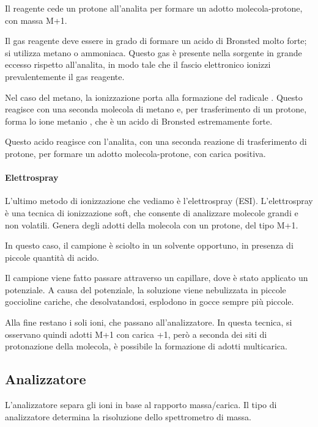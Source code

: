 Il reagente cede un protone all'analita per formare un adotto
molecola-protone, con massa M+1.

Il gas reagente deve essere in grado di formare un acido di Bronsted
molto forte; si utilizza metano o ammoniaca. Questo gas è presente nella
sorgente in grande eccesso rispetto all'analita, in modo tale che il
fascio elettronico ionizzi prevalentemente il gas reagente.

Nel caso del metano, la ionizzazione porta alla formazione del radicale
. Questo reagisce con una seconda molecola di metano e, per
trasferimento di un protone, forma lo ione metanio , che è un
acido di Bronsted estremamente forte.

Questo acido reagisce con l'analita, con una seconda reazione di
trasferimento di protone, per formare un adotto molecola-protone, con
carica positiva.

\paragraph{Elettrospray}

L'ultimo metodo di ionizzazione che vediamo è l'elettrospray (ESI).
L'elettrospray è una tecnica di ionizzazione soft, che consente di
analizzare molecole grandi e non volatili. Genera degli adotti della
molecola con un protone, del tipo M+1.


In questo caso, il campione è sciolto in un solvente opportuno, in
presenza di piccole quantità di acido.

Il campione viene fatto passare attraverso un capillare, dove è stato
applicato un potenziale. A causa del potenziale, la soluzione viene
nebulizzata in piccole goccioline cariche, che desolvatandosi, esplodono
in gocce sempre più piccole.

Alla fine restano i soli ioni, che passano all'analizzatore. In questa
tecnica, si osservano quindi adotti M+1 con carica +1, però a seconda
dei siti di protonazione della molecola, è possibile la formazione di
adotti multicarica.

\subsection{Analizzatore}

L'analizzatore separa gli ioni in base al rapporto massa/carica. Il tipo
di analizzatore determina la risoluzione dello spettrometro di massa.

